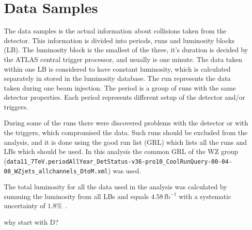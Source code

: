 \chapter{Data Samples}
\label{sec:DataSamples}

The data samples is the actual information about collisions taken from the detector. This information is divided into periods, runs and luminosity blocks (LB). The luminosity block is the smallest of the three, it's duration is decided by the ATLAS central trigger processor, and usually is one minute. The data taken within one LB is considered to have constant luminosity, which is calculated separately in stored in the luminosity database. The run represents the data taken during one beam injection. The period is a group of runs with the same detector properties. Each period represents different setup of the detector and/or triggers.

During some of the runs there were discovered problems with the detector or with the triggers, which compromised the data. Such runs should be excluded from the analysis, and it is done using the good run list (GRL) which lists all the runs and LBs which should be used. In this analysis the common GRL of the WZ group\\
(\texttt{\footnotesize data11\_7TeV.periodAllYear\_DetStatus-v36-pro10\_CoolRunQuery-00-04-08\_WZjets\_allchannels\_DtoM.xml}) was used.

The total luminosity for all the data used in the analysis was calculated by summing the luminosity from all LBs and equals \ensuremath{4.58\,\mathrm{fb}^{-1}} with a systematic uncertainty of $1.8\%$~\cite{lib:lumi}.

why start with D? \tbu

\begin{figure}[htb]
\end{figure}


